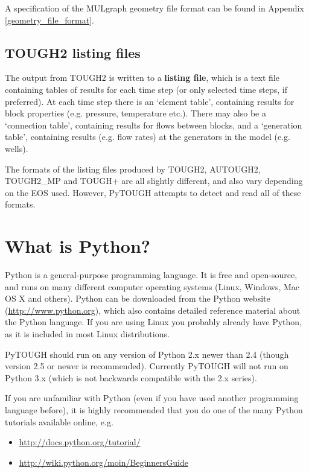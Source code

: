 A specification of the MULgraph geometry file format can be found in Appendix \ref{geometry_file_format}.

\subsection{TOUGH2 listing files}

The output from TOUGH2 is written to a \textbf{listing file}, which is a text file containing tables of results for each time step (or only selected time steps, if preferred).  At each time step there is an `element table', containing results for block properties (e.g. pressure, temperature etc.).  There may also be a `connection table', containing results for flows between blocks, and a `generation table', containing results (e.g. flow rates) at the generators in the model (e.g. wells).

The formats of the listing files produced by TOUGH2, AUTOUGH2, TOUGH2\_MP and TOUGH+ are all slightly different, and also vary depending on the EOS used.  However, PyTOUGH attempts to detect and read all of these formats.

\section{What is Python?}

Python is a general-purpose programming language.  It is free and open-source, and runs on many different computer operating systems (Linux, Windows, Mac OS X and others).  Python can be downloaded from the Python website (\url{http://www.python.org}), which also contains detailed reference material about the Python language.  If you are using Linux you probably already have Python, as it is included in most Linux distributions.

PyTOUGH should run on any version of Python 2.x newer than 2.4 (though version 2.5 or newer is recommended).  Currently PyTOUGH will not run on Python 3.x (which is not backwards compatible with the 2.x series).

If you are unfamiliar with Python (even if you have used another programming language before), it is highly recommended that you do one of the many Python tutorials available online, e.g.

\begin{itemize}
  \item \url{http://docs.python.org/tutorial/}
  \item \url{http://wiki.python.org/moin/BeginnersGuide}
\end{itemize}

